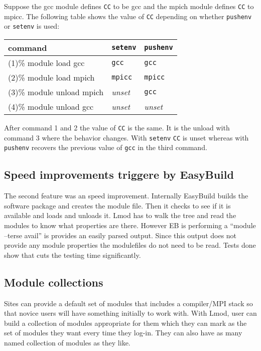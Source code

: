 Suppose the gcc module defines \texttt{CC} to be gcc and the mpich module
defines \texttt{CC} to mpicc.  The following table shows the value of \texttt{CC}
depending on whether \texttt{pushenv} or \texttt{setenv} is used:
\begin{center}
    \begin{tabular}{l|l|l}
       command                    & \texttt{setenv} & \texttt{pushenv} \\ \hline
       (1)\% module load   gcc    & \texttt{gcc}    & \texttt{gcc}     \\ 
       (2)\% module load   mpich  & \texttt{mpicc}  & \texttt{mpicc}   \\
       (3)\% module unload mpich  & \emph{unset}    & \texttt{gcc}     \\
       (4)\% module unload gcc    & \emph{unset}    & \emph{unset}     \\ \hline
    \end{tabular}
\end{center}
\noindent
After command 1 and 2 the value of \texttt{CC} is the same.  It is the unload
with command 3 where the behavior changes.  With \texttt{setenv} \texttt{CC} is unset
whereas with \texttt{pushenv} recovers the previous value of
\texttt{gcc} in the third command.  


\subsection{Speed improvements triggere by EasyBuild}

The second feature was an speed improvement.  Internally EasyBuild
builds the software package and creates the module file.  Then it
checks to see if it is available and loads and unloads it.  Lmod has
to walk the tree and read the modules to know what properties are
there. However EB is performing a ``module --terse avail'' is provides
an easily parsed output.  Since this output does not provide any
module properties the modulefiles do not need to be read.  Tests done
show that cuts the testing time significantly.

\subsection{Module collections}

Sites can provide a default set of modules that includes a
compiler/MPI stack so that novice users will have something initially
to work with.  With Lmod, user can build a collection of modules
appropriate for them which they can mark as the set of modules they
want every time they log-in.  They can also have as many named
collection of modules as they like.


